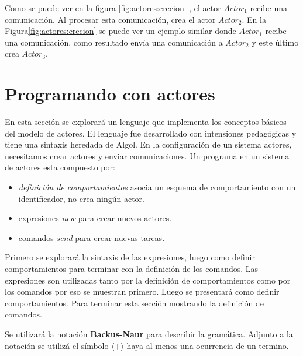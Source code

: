 Como se puede ver en la figura \ref{fig:actores:crecion} , el actor $Actor_1$ recibe una comunicación. Al procesar esta comunicación, crea el actor $Actor_2$. En la Figura\ref{fig:actores:crecion}  se puede ver un ejemplo similar donde $Actor_1$ recibe una comunicación, como resultado envía una comunicación a $Actor_2$ y este último crea $Actor_3$.


\section{Programando con actores}\label{actores:sal}

En esta sección se explorará un lenguaje que implementa los conceptos básicos del modelo de actores. El lenguaje \SAL fue desarrollado con intensiones pedagógicas y tiene una sintaxis heredada de Algol. 
En la configuración de un sistema actores, necesitamos crear actores y enviar comunicaciones. Un programa en un sistema de actores esta compuesto por:

\begin{itemize}
 \item \textit{definición de comportamientos} asocia un esquema de comportamiento con un identificador, no crea ningún actor.
 \item expresiones \textit{new} para crear nuevos actores.
 \item comandos \textit{send} para crear nuevas tareas.
\end{itemize}

Primero se explorará la sintaxis de las expresiones, luego como definir comportamientos para terminar con la definición de los comandos. Las expresiones son utilizadas tanto por la definición de comportamientos como por los comandos por eso se muestran primero. Luego se presentará como definir comportamientos. Para terminar esta sección mostrando la definición de comandos.


Se utilizará la notación \textbf{Backus-Naur}\cite{McCracken:2003:BF:1074100.1074155} para describir la gramática. Adjunto a la notación se utilizá el símbolo $\langle \textbf{+} \rangle$ haya al menos una ocurrencia de un termino.


